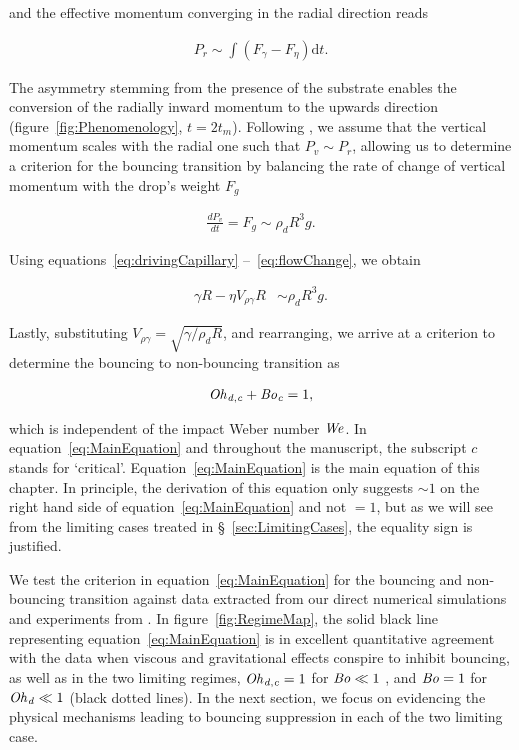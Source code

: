 \noindent and the effective momentum converging in the radial direction reads

\begin{align}
	\label{eq:flowChange}
	P_r \sim \int \left(F_\gamma - F_\eta\right) \mathrm{d}t.
\end{align}

\noindent The asymmetry stemming from the presence of the substrate enables the conversion of the radially inward momentum to the upwards direction (figure~\ref{fig:Phenomenology}, $t = 2t_m$). Following \citet{mouterde2017merging, lecointre2019ballistics}, we assume that the vertical momentum scales with the radial one such that $P_v \sim P_r$, allowing us to determine a criterion for the bouncing transition by balancing the rate of change of vertical momentum with the drop's weight $F_g$

\begin{align}
	\label{eq:competeGravity1}
	\frac{dP_v}{dt} = F_g \sim \rho_dR^3g.
\end{align}

\noindent Using equations~\eqref{eq:drivingCapillary} --~\eqref{eq:flowChange}, we obtain 

\begin{align}
	\label{eq:competeGravity3}
	\gamma R - \eta V_{\rho\gamma} R &\sim \rho_dR^3g.
\end{align}

\noindent Lastly, substituting $V_{\rho\gamma} = \sqrt{\gamma/\rho_dR}$, and rearranging, we arrive at a criterion to determine the bouncing to non-bouncing transition as

\begin{align}
	\label{eq:MainEquation}
	\mathit{Oh}_\mathit{d,c} + \mathit{Bo}_\mathit{c} = 1,
\end{align}

\noindent which is independent of the impact Weber number $\mathit{We}$. In equation~\eqref{eq:MainEquation} and throughout the manuscript, the subscript $c$ stands for \lq critical\rq. Equation~\eqref{eq:MainEquation} is the main equation of this chapter. In principle, the derivation of this equation only suggests $\sim 1$ on the right hand side of equation~\eqref{eq:MainEquation} and not $= 1$, but as we will see from the limiting cases treated in \S~\ref{sec:LimitingCases}, the equality sign is justified. 

We test the criterion in equation~\eqref{eq:MainEquation} for the bouncing and non-bouncing transition against data extracted from our direct numerical simulations and experiments from \citet{biance2006, jha2020viscous, vatsalInProgressFilms}. 
In figure~\ref{fig:RegimeMap}, the solid black line representing equation~\eqref{eq:MainEquation} is in excellent quantitative agreement with the data when viscous and gravitational effects conspire to inhibit bouncing, as well as in the two limiting regimes, $\mathit{Oh}_\mathit{d,c} = 1$ for $\mathit{Bo} \ll 1$ \citep{jha2020viscous}, and $\mathit{Bo} = 1$ for $\mathit{Oh}_\mathit{d} \ll 1$ \citep{biance2006} (black dotted lines). 
In the next section, we focus on evidencing the physical mechanisms leading to bouncing suppression in each of the two limiting case.

